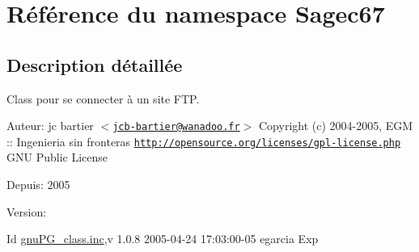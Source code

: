 \hypertarget{namespaceSagec67}{
\section{R\'{e}f\'{e}rence du namespace Sagec67}
\label{namespaceSagec67}
}




\subsection{Description d\'{e}taill\'{e}e}
Class pour se connecter \`{a} un site FTP.

\begin{Desc}
\item[Auteur:]jc bartier $<$\href{mailto:jcb-bartier@wanadoo.fr}{\tt jcb-bartier@wanadoo.fr}$>$  Copyright (c) 2004-2005, EGM :: Ingenieria sin fronteras  \href{http://opensource.org/licenses/gpl-license.php}{\tt http://opensource.org/licenses/gpl-license.php} GNU Public License \end{Desc}
\begin{Desc}
\item[Depuis:]2005 \end{Desc}
\begin{Desc}
\item[Version:]\begin{Desc}
\item[Id]\hyperlink{gnuPG__class_8inc}{gnu\-PG\_\-class.inc},v 1.0.8 2005-04-24 17:03:00-05 egarcia Exp \end{Desc}
\end{Desc}



